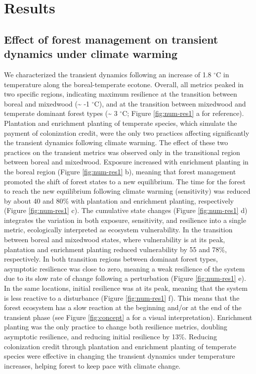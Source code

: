 \hypertarget{results}{%
\section{Results}\label{results}}

\hypertarget{effect-of-forest-management-on-transient-dynamics-under-climate-warming}{%
\subsection{Effect of forest management on transient dynamics under
climate
warming}\label{effect-of-forest-management-on-transient-dynamics-under-climate-warming}}

We characterized the transient dynamics following an increase of 1.8
\(^{\circ}\)C in temperature along the boreal-temperate ecotone.
Overall, all metrics peaked in two specific regions, indicating maximum
resilience at the transition between boreal and mixedwood
(\textasciitilde{} -1 \(^{\circ}\)C), and at the transition between
mixedwood and temperate dominant forest types (\textasciitilde{} 3
\(^{\circ}\)C; Figure \ref{fig:num-res1} a for reference). Plantation
and enrichment planting of temperate species, which simulate the payment
of colonization credit, were the only two practices affecting
significantly the transient dynamics following climate warming. The
effect of these two practices on the transient metrics was observed only
in the transitional region between boreal and mixedwood. Exposure
increased with enrichment planting in the boreal region (Figure
\ref{fig:num-res1} b), meaning that forest management promoted the shift
of forest states to a new equilibrium. The time for the forest to reach
the new equilibrium following climate warming (sensitivity) was reduced
by about 40 and 80\% with plantation and enrichment planting,
respectively (Figure \ref{fig:num-res1} c). The cumulative state changes
(Figure \ref{fig:num-res1} d) integrates the variation in both exposure,
sensitivity, and resilience into a single metric, ecologically
interpreted as ecosystem vulnerability. In the transition between boreal
and mixedwood states, where vulnerability is at its peak, plantation and
enrichment planting reduced vulnerability by 55 and 78\%, respectively.
In both transition regions between dominant forest types, asymptotic
resilience was close to zero, meaning a weak resilience of the system
due to its slow rate of change following a perturbation (Figure
\ref{fig:num-res1} e). In the same locations, initial resilience was at
its peak, meaning that the system is less reactive to a disturbance
(Figure \ref{fig:num-res1} f). This means that the forest ecosystem has
a slow reaction at the beginning and/or at the end of the transient
phase (see Figure \ref{fig:concept} a for a visual interpretation).
Enrichment planting was the only practice to change both resilience
metrics, doubling asymptotic resilience, and reducing initial resilience
by 13\%. Reducing colonization credit through plantation and enrichment
planting of temperate species were effective in changing the transient
dynamics under temperature increases, helping forest to keep pace with
climate change.

